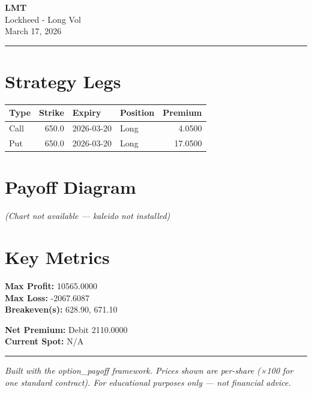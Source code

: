 \documentclass{article}
\begin{document}
\begin{flushright}
  {\large\textbf{LMT}} \\[2pt]
  {\normalsize Lockheed - Long Vol} \\[2pt]
  {\small March 17, 2026}
\end{flushright}

\noindent\rule{\linewidth}{0.5pt}
\vspace{6pt}

\section*{Strategy Legs}
\begin{tabular}{@{}lrllr@{}}
  \toprule
  \textbf{Type} & \textbf{Strike} & \textbf{Expiry} & \textbf{Position} & \textbf{Premium} \\
  \midrule
  Call & 650.0 & 2026-03-20 & Long & 4.0500 \\
  Put & 650.0 & 2026-03-20 & Long & 17.0500 \\
  \bottomrule
\end{tabular}

\vspace{14pt}

\section*{{Payoff Diagram}}
\begin{{center}}
  \textit{{(Chart not available — kaleido not installed)}}
\end{{center}}

\vspace{{10pt}}

\section*{Key Metrics}
\noindent
\begin{minipage}[t]{0.48\linewidth}
  \textbf{Max Profit:}    10565.0000 \\[4pt]
  \textbf{Max Loss:}      -2067.6087 \\[4pt]
  \textbf{Breakeven(s):}  628.90, 671.10
\end{minipage}\hfill
\begin{minipage}[t]{0.48\linewidth}
  \textbf{Net Premium:}   Debit 2110.0000 \\[4pt]
  \textbf{Current Spot:}  N/A
\end{minipage}

\vspace{14pt}
\noindent\rule{\linewidth}{0.5pt}
\vspace{4pt}

\begin{center}
  \small\textit{Built with the option\_payoff framework. Prices shown are per-share (×100 for one standard contract). For educational purposes only --- not financial advice.}
\end{center}
\end{document}
